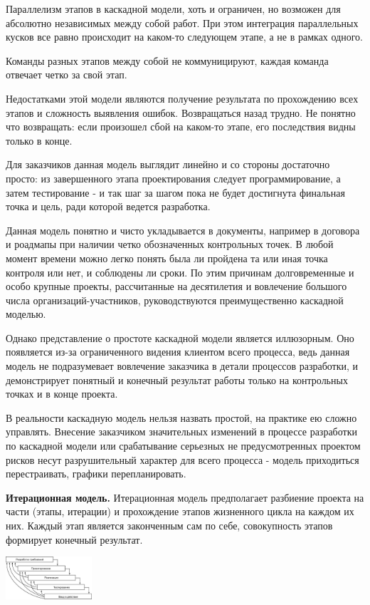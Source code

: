 Параллелизм этапов в каскадной модели, хоть и ограничен, но возможен для абсолютно независимых между собой работ. При этом интеграция параллельных кусков все равно происходит на каком-то следующем этапе, а не в рамках одного.

Команды разных этапов между собой не коммуницируют, каждая команда отвечает четко за свой этап.

Недостатками этой модели являются получение результата  по прохождению всех этапов и сложность выявления ошибок. Возвращаться назад трудно. Не понятно что возвращать: если произошел сбой на каком-то этапе, его последствия видны только в конце. 

Для заказчиков данная модель выглядит линейно и со стороны достаточно просто: из завершенного этапа проектирования следует программирование, а затем тестирование - и так шаг за шагом пока не будет достигнута финальная точка и цель, ради которой ведется разработка. 

Данная модель понятно и чисто укладывается в документы, например в договора и роадмапы при наличии четко обозначенных контрольных точек. В любой момент времени можно легко понять была ли пройдена та или иная точка контроля или нет, и соблюдены ли сроки. По этим причинам долговременные и особо крупные проекты, рассчитанные на десятилетия и вовлечение большого числа организаций-участников, руководствуются преимущественно каскадной моделью. 

Однако представление о простоте каскадной модели является иллюзорным. Оно появляется из-за ограниченного видения клиентом всего процесса, ведь данная модель не подразумевает вовлечение заказчика в детали процессов разработки, и демонстрирует понятный и конечный результат работы только на контрольных точках и в конце проекта. 

В реальности каскадную модель нельзя назвать простой, на практике ею сложно управлять.  Внесение заказчиком значительных изменений в процессе разработки по каскадной модели или срабатывание серьезных не предусмотренных проектом рисков несут разрушительный характер для всего процесса - модель приходиться перестраивать, графики перепланировать. 

\textbf{Итерационная модель.} Итерационная модель предполагает разбиение проекта на части (этапы, итерации) и прохождение этапов жизненного цикла на каждом их них. Каждый этап является законченным сам по себе, совокупность этапов формирует конечный результат.

\includegraphics[width=0.24\textwidth]{pics/iterate.png}

